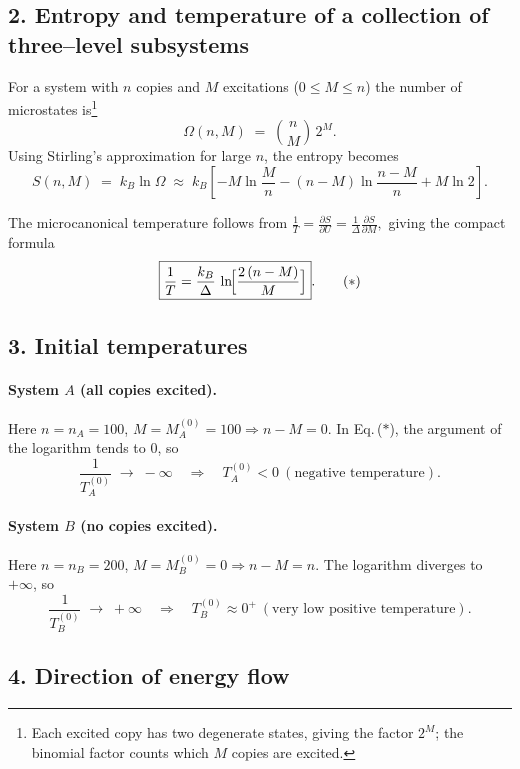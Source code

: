\documentclass[12pt]{article}
\theoremstyle{definition} %
\theoremstyle{plain} %
\begin{document}
\subsection*{2.  Entropy and temperature of a collection of three–level subsystems}

For a system with \(n\) copies and \(M\) excitations (\(0\le M\le n\)) the number of
micro\-states is\footnote{%
Each excited copy has two degenerate states, giving the factor \(2^{M}\);
the binomial factor counts which \(M\) copies are excited.}
\[
    \Omega(n,M)
    \;=\;
    \binom{n}{M}\,2^{M}.
\]
Using Stirling’s approximation for large \(n\), the entropy becomes
\[
  S(n,M)
  \;=\;
  k_B\ln\Omega
  \;\approx\;
  k_B
  \!\left[
      -M\ln\!\frac{M}{n}
      -(n-M)\ln\!\frac{n-M}{n}
      +M\ln 2
  \right].
\]

The microcanonical temperature follows from
\(
  \displaystyle
  \frac{1}{T}
  =
  \frac{\partial S}{\partial U}
  =
  \frac{1}{\Delta}\frac{\partial S}{\partial M},
\)
giving the compact formula
\[
  \boxed{%
    \frac{1}{T}
    =
    \frac{k_B}{\Delta}
    \,\ln\!\Bigl[\frac{2\,(n-M)}{M}\Bigr]
  } .
  \tag{$\ast$}
\]

\subsection*{3.  Initial temperatures}

\paragraph{System \(A\) (all copies excited).}
Here \(n=n_A=100\), \(M=M_A^{(0)}=100\Rightarrow n-M=0\).  
In Eq.\,($\ast$), the argument of the logarithm tends to \(0\), so
\[
  \frac{1}{T_A^{(0)}}\;\longrightarrow\; -\infty
  \quad\Longrightarrow\quad
  \boxed{T_A^{(0)}<0\ (\text{negative temperature})}.
\]

\paragraph{System \(B\) (no copies excited).}
Here \(n=n_B=200\), \(M=M_B^{(0)}=0\Rightarrow n-M=n\).  
The logarithm diverges to \(+\infty\), so
\[
  \frac{1}{T_B^{(0)}}\;\longrightarrow\; +\infty
  \quad\Longrightarrow\quad
  \boxed{T_B^{(0)}\approx 0^{+}\ (\text{very low positive temperature})}.
\]

\subsection*{4.  Direction of energy flow}
\end{document}
